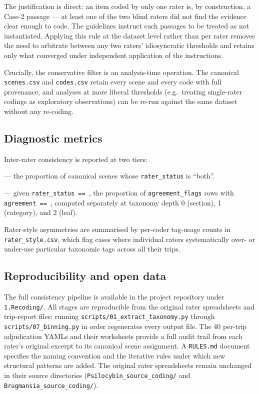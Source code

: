 The justification is direct: an item coded by only one rater is, by construction, a Case-2 passage --- at least one of the two blind raters did not find the evidence clear enough to code. The guidelines instruct such passages to be treated as not instantiated. Applying this rule at the dataset level rather than per rater removes the need to arbitrate between any two raters' idiosyncratic thresholds and retains only what converged under independent application of the instructions.

Crucially, the conservative filter is an analysis-time operation. The canonical \texttt{scenes.csv} and \texttt{codes.csv} retain every scene and every code with full provenance, and analyses at more liberal thresholds (e.g.\ treating single-rater codings as exploratory observations) can be re-run against the same dataset without any re-coding.

\subsection{Diagnostic metrics}
\label{sec:diagnostics}

Inter-rater consistency is reported at two tiers:

\begin{description}[itemsep=2pt]
\item[Scene-individuation agreement] --- the proportion of canonical scenes whose \texttt{rater\_status} is ``both''.
\item[Conditional classification agreement] --- given \texttt{rater\_status == }, the proportion of \texttt{agreement\_flags} rows with \texttt{agreement == }, computed separately at taxonomy depth 0 (section), 1 (category), and 2 (leaf).
\end{description}

Rater-style asymmetries are summarised by per-coder tag-usage counts in \texttt{rater\_style.csv}, which flag cases where individual raters systematically over- or under-use particular taxonomic tags across all their trips.

\subsection{Reproducibility and open data}
\label{sec:reproducibility}

The full consistency pipeline is available in the project repository under \texttt{1.Recoding/}. All stages are reproducible from the original rater spreadsheets and trip-report files: running \texttt{scripts/01\_extract\_taxonomy.py} through \texttt{scripts/07\_binning.py} in order regenerates every output file. The 40 per-trip adjudication YAMLs and their worksheets provide a full audit trail from each rater's original excerpt to its canonical scene assignment. A \texttt{RULES.md} document specifies the naming convention and the iterative rules under which new structural patterns are added. The original rater spreadsheets remain unchanged in their source directories (\texttt{Psilocybin\_source\_coding/} and \texttt{Brugmansia\_source\_coding/}).
